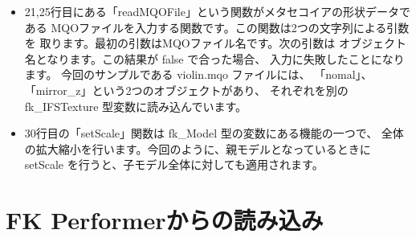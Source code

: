 \begin{itemize}
 \item 21,25行目にある「readMQOFile」という関数がメタセコイアの形状データである
	MQOファイルを入力する関数です。この関数は2つの文字列による引数を
	取ります。最初の引数はMQOファイル名です。次の引数は
	オブジェクト名となります。この結果が false で合った場合、
	入力に失敗したことになります。
	今回のサンプルである violin.mqo ファイルには、
	「nomal」、「mirror\_z」という2つのオブジェクトがあり、
	それぞれを別の fk\_IFSTexture 型変数に読み込んでいます。

 \item 30行目の「setScale」関数は fk\_Model 型の変数にある機能の一つで、
	全体の拡大縮小を行います。今回のように、親モデルとなっているときに
	setScale を行うと、子モデル全体に対しても適用されます。
\end{itemize}
\section{FK Performerからの読み込み} \label{sec:09-performer}
